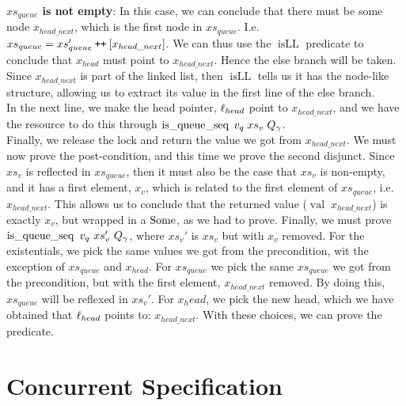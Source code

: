 \documentclass[twoside,11pt,openright]{report}
\newcommand{\isqueueseq}{\operatorname{is\_queue\_seq}}
\newcommand{\isLL}{\operatorname{isLL}}
\newcommand{\nVal}[1]{\operatorname{val} \; #1}
\newcommand\catenate{\mathbin{\text{\ttfamily\upshape ++}}}
\begin{document}
\textbf{$xs_{queue}$ is not empty}: In this case, we can conclude that there must be some node $x_{head\_next}$, which is the first node in $xs_{queue}$. I.e. $xs_{queue} = xs'_{queue} \catenate [x_{head\_next}]$. We can thus use the $\isLL$ predicate to conclude that $x_{head}$ must point to $x_{head\_next}$. Hence the else branch will be taken. Since $x_{head\_next}$ is part of the linked list, then $\isLL$ tells us it has the node-like structure, allowing us to extract its value in the first line of the else branch.\\
In the next line, we make the head pointer, $\ell_{head}$ point to $x_{head\_next}$, and we have the resource to do this through $\isqueueseq \; v_q \; xs_v \; Q_\gname$.\\
Finally, we release the lock and return the value we got from $x_{head\_next}$. We must now prove the post-condition, and this time we prove the second disjunct. Since $xs_v$ is reflected in $xs_{queue}$, then it must also be the case that $xs_v$ is non-empty, and it has a first element, $x_v$, which is related to the first element of $xs_{queue}$, i.e. $x_{head\_next}$. This allows us to conclude that the returned value ($\nVal{x_{head\_next}}$) is exactly $x_v$, but wrapped in a $\operatorname{Some}$, as we had to prove.
Finally, we must prove $\isqueueseq\ v_q\ xs_v'\ Q_\gname$, where $xs_v'$ is $xs_v$ but with $x_v$ removed. For the existentials, we pick the same values we got from the precondition, wit the exception of $xs_{queue}$ and $x_{head}$. For $xs_{queue}$ we pick the same $xs_{queue}$ we got from the precondition, but with the first element, $x_{head\_next}$ removed. By doing this, $xs_{queue}$ will be reflexed in $xs_v'$. For $x_head$, we pick the new head, which we have obtained that $\ell_{head}$ points to: $x_{head\_next}$. With these choices, we can prove the predicate.



\section{Concurrent Specification}
\label{TLMSQ:section:concurrent}
\end{document}
